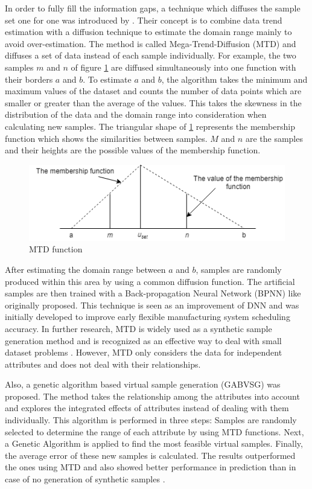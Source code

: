 \documentclass[parskip=full]{scrartcl}
\begin{document}
In order to fully fill the information gaps, a technique which diffuses the
sample set one for one was introduced by \cite{Li.2007}. Their concept is to
combine data trend estimation with a diffusion technique to estimate the domain
range mainly to avoid over-estimation. The method is called Mega-Trend-Diffusion
(MTD) and diffuses a set of data instead of each sample individually. For
example, the two samples $\mathit{m}$ and $\mathit{n}$ of figure
\ref{fig:mtd-function} are diffused simultaneously into one function with their
borders $\mathit{a}$ and $\mathit{b}$. To estimate $\mathit{a}$ and
$\mathit{b}$, the algorithm takes the minimum and maximum values of the dataset
and counts the number of data points which are smaller or greater than the
average of the values. This takes the skewness in the distribution of the data
and the domain range into consideration when calculating new samples. The
triangular shape of \ref{fig:mtd-function} represents the membership function
which shows the similarities between samples. $\mathit{M}$ and $\mathit{n}$ are
the samples and their heights are the possible values of the membership
function.

\begin{figure}[H]
	\centering
	\includegraphics[width=0.6\linewidth]{../analysis/mtd_function.png}
	\caption{MTD function \cite{Li.2007}}
	\label{fig:mtd-function}
\end{figure}

After estimating the domain range between $\mathit{a}$ and $\mathit{b}$, samples
are randomly produced within this area by using a common diffusion function. The
artificial samples are then trained with a Back-propagation Neural Network
(BPNN) like \cite{Huang.2004} originally proposed. This technique is seen as an
improvement of DNN and was initially developed to improve early flexible
manufacturing system scheduling accuracy. In further research, MTD is widely
used as a synthetic sample generation method and is recognized as an effective
way to deal with small dataset problems \cite{AbdulLateh.2017}. However, MTD
only considers the data for independent attributes and does not deal with their
relationships. 

Also, a genetic algorithm based virtual sample generation (GABVSG) was proposed.
The method takes the relationship among the attributes into account and explores
the integrated effects of attributes instead of dealing with them individually.
This algorithm is performed in three steps: Samples are randomly selected to
determine the range of each attribute by using MTD functions. Next, a Genetic
Algorithm is applied to find the most feasible virtual samples. Finally, the
average error of these new samples is calculated. The results outperformed the
ones using MTD and also showed better performance in prediction than in case of
no generation of synthetic samples \cite{Li.2014}.
\end{document}
